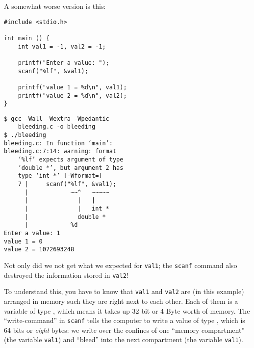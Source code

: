 A somewhat worse version is this:
\begin{tcbraster}[raster columns=2,
                  raster equal height,
                  nobeforeafter,
                  raster column skip=0.2cm]
\begin{warnbox}[bleeding.c, leftupper=7mm]
\begin{verbatim}
#include <stdio.h>

int main () {
    int val1 = -1, val2 = -1;

    printf("Enter a value: ");
    scanf("%lf", &val1);

    printf("value 1 = %d\n", val1);
    printf("value 2 = %d\n", val2);
}
\end{verbatim}
\end{warnbox}
%
\begin{cmdbox}
\begin{verbatim}
$ gcc -Wall -Wextra -Wpedantic 
    bleeding.c -o bleeding
$ ./bleeding
bleeding.c: In function ‘main’:
bleeding.c:7:14: warning: format 
    ‘%lf’ expects argument of type 
    ‘double *’, but argument 2 has 
    type ‘int *’ [-Wformat=]
    7 |     scanf("%lf", &val1);
      |            ~~^   ~~~~~
      |              |   |
      |              |   int *
      |              double *
      |            %d
Enter a value: 1
value 1 = 0
value 2 = 1072693248
\end{verbatim}
\end{cmdbox}
\end{tcbraster}

Not only did we not get what we expected for \texttt{val1}; the \texttt{scanf} command also destroyed the information stored in \texttt{val2}!

To understand this, you have to know that \texttt{val1} and \texttt{val2} are (in this example) arranged in memory such they are right next to each other. Each of them is a variable of type , which means it takes up 32 bit or 4 Byte worth of memory. The \enquote{write-command} in \texttt{scanf} tells the computer to write a value of type , which is 64 bits or \emph{eight} bytes: we write over the confines of one \enquote{memory compartment} (the variable \texttt{val1}) and \enquote{bleed} into the next compartment (the variable \texttt{val1}).


